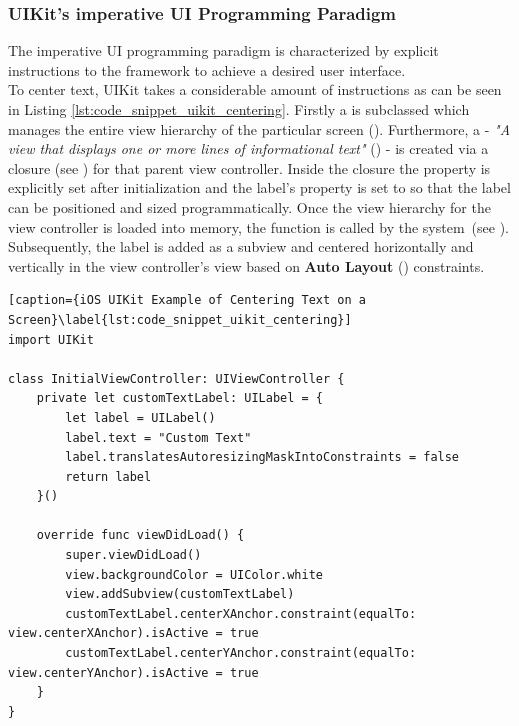 \subsubsection{UIKit's imperative UI Programming Paradigm}
The imperative UI programming paradigm is characterized by explicit instructions to the framework to achieve a desired user interface.\\
To center text, UIKit takes a considerable amount of instructions as can be seen in Listing \ref{lst:code_snippet_uikit_centering}.
Firstly a  is subclassed which manages the entire view hierarchy of the particular screen (\cite{UIViewControllerDocumentation2021}). 
Furthermore, a  - \textit{"A view that displays one or more lines of informational text"} (\cite[l.1]{UILabelDocumentation2021}) - is created via a closure (see \cite{ClosureDocumentation2021}) for that parent view controller.
Inside the closure the  property is explicitly set after initialization and the label's  property is set to  so that the label can be positioned and sized programmatically.
Once the view hierarchy for the view controller is loaded into memory, the  function is called by the system (see \cite{viewDidLoadDocumentation2021}).
Subsequently, the label is added as a subview and centered horizontally and vertically in the view controller's view based on \textbf{Auto Layout} (\cite{AutoLayoutDocumentation2016}) constraints.\\

\begin{minipage}{\linewidth}
    \begin{lstlisting}[caption={iOS UIKit Example of Centering Text on a Screen}\label{lst:code_snippet_uikit_centering}]
import UIKit

class InitialViewController: UIViewController {
    private let customTextLabel: UILabel = {
        let label = UILabel()
        label.text = "Custom Text"
        label.translatesAutoresizingMaskIntoConstraints = false
        return label
    }()

    override func viewDidLoad() {
        super.viewDidLoad()
        view.backgroundColor = UIColor.white
        view.addSubview(customTextLabel)
        customTextLabel.centerXAnchor.constraint(equalTo: view.centerXAnchor).isActive = true
        customTextLabel.centerYAnchor.constraint(equalTo: view.centerYAnchor).isActive = true
    }
}
    \end{lstlisting}
\end{minipage}

